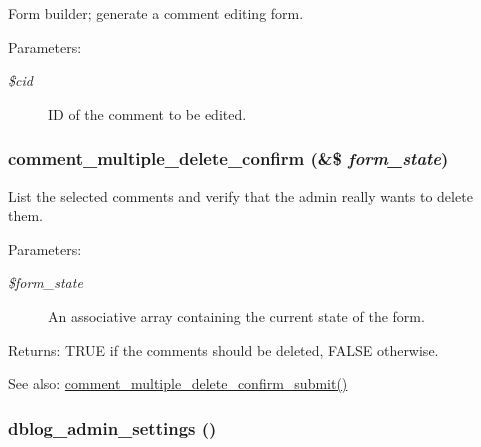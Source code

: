 Form builder; generate a comment editing form.

\begin{Desc}
\item[Parameters:]
\begin{description}
\item[{\em \$cid}]ID of the comment to be edited. \end{description}
\end{Desc}
\hypertarget{group__forms_gb4ac3160c4ff7fd609772342f0df02a8}{
\subsubsection[{comment\_\-multiple\_\-delete\_\-confirm}]{\setlength{\rightskip}{0pt plus 5cm}comment\_\-multiple\_\-delete\_\-confirm (\&\$ {\em form\_\-state})}}
\label{group__forms_gb4ac3160c4ff7fd609772342f0df02a8}


List the selected comments and verify that the admin really wants to delete them.

\begin{Desc}
\item[Parameters:]
\begin{description}
\item[{\em \$form\_\-state}]An associative array containing the current state of the form. \end{description}
\end{Desc}
\begin{Desc}
\item[Returns:]TRUE if the comments should be deleted, FALSE otherwise.\end{Desc}
\begin{Desc}
\item[See also:]\hyperlink{comment_8admin_8inc_0995d69b00481eb46c1981112df0999f}{comment\_\-multiple\_\-delete\_\-confirm\_\-submit()} \end{Desc}
\hypertarget{group__forms_g6447ffdcc2e017bea1328ce4b314edfd}{
\subsubsection[{dblog\_\-admin\_\-settings}]{\setlength{\rightskip}{0pt plus 5cm}dblog\_\-admin\_\-settings ()}}
\label{group__forms_g6447ffdcc2e017bea1328ce4b314edfd}


